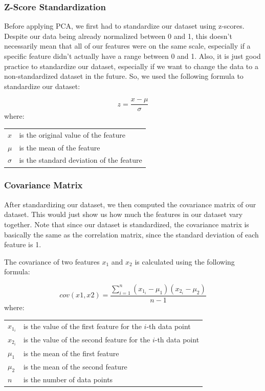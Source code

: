 \documentclass[11pt]{article}
\begin{document}
\subsubsection{Z-Score Standardization}

Before applying PCA, we first had to standardize our dataset using z-scores. Despite our data being already normalized between 0 and 1, this doesn't necessarily mean that all of our features were on the same scale, especially if a specific feature didn't actually have a range between 0 and 1. Also, it is just good practice to standardize our dataset, especially if we want to change the data to a non-standardized dataset in the future. So, we used the following formula to standardize our dataset:

\begin{equation}
    z = \frac{x - \mu}{\sigma}
\end{equation}
where:
\begin{tabular}{ll}
    $x$ & is the original value of the feature \\
    $\mu$ & is the mean of the feature \\
    $\sigma$ & is the standard deviation of the feature
\end{tabular}

\subsubsection{Covariance Matrix}

After standardizing our dataset, we then computed the covariance matrix of our dataset. This would just show us how much the features in our dataset vary together. Note that since our dataset is standardized, the covariance matrix is basically the same as the correlation matrix, since the standard deviation of each feature is 1.

The covariance of two features $x_1$ and $x_2$ is calculated using the following formula:

\begin{equation}
    cov(x1, x2) = \frac{\sum_{i = 1}^{n}(x_{1_i} - \mu_1)(x_{2_i} - \mu_2)}{n - 1}
\end{equation}
where:
\begin{tabular}{ll}
    $x_{1_i}$ & is the value of the first feature for the $i$-th data point \\
    $x_{2_i}$ & is the value of the second feature for the $i$-th data point \\
    $\mu_1$ & is the mean of the first feature \\
    $\mu_2$ & is the mean of the second feature \\
    $n$ & is the number of data points
\end{tabular}
\end{document}
